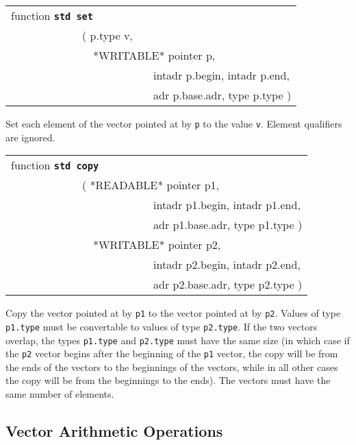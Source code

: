 \documentclass[12pt]{article}
\makeatletter
\newcommand{\TT}[1]{{\tt \bfseries #1}}
\newcommand{\ttstdmkey}[2]{\TT{std #1}\index{#1@{\tt std #1}!#2}}
\newenvironment{indpar}[1][0.3in]%
	{\begin{list}{}%
		     {\setlength{\itemsep}{0in}%
		      \setlength{\topsep}{0in}%
		      \setlength{\parsep}{1ex}%
		      \setlength{\labelwidth}{#1}%
		      \setlength{\leftmargin}{#1}%
		      \addtolength{\leftmargin}{\labelsep}}%
	 \item}%
	{\end{list}}
\makeatother
\begin{document}
\begin{indpar}

{\tt\begin{tabular}{@{}l}
function \ttstdmkey{set}{vectors} \\
~~~~~~~~~~~~~( p.type v, \\
~~~~~~~~~~~~~~~*WRITABLE* pointer p, \\
~~~~~~~~~~~~~~~~~~~~~~~~~~intadr p.begin, intadr p.end, \\
~~~~~~~~~~~~~~~~~~~~~~~~~~adr p.base.adr, type p.type ) \\
\end{tabular}}

\begin{indpar}
Set each element of the vector pointed at by {\tt p} to the value {\tt v}.
Element qualifiers are ignored.
\end{indpar}

{\tt\begin{tabular}{@{}l}
function \ttstdmkey{copy}{vectors} \\
~~~~~~~~~~~~~( *READABLE* pointer p1, \\
~~~~~~~~~~~~~~~~~~~~~~~~~~intadr p1.begin, intadr p1.end, \\
~~~~~~~~~~~~~~~~~~~~~~~~~~adr p1.base.adr, type p1.type ) \\
~~~~~~~~~~~~~~~*WRITABLE* pointer p2, \\
~~~~~~~~~~~~~~~~~~~~~~~~~~intadr p2.begin, intadr p2.end, \\
~~~~~~~~~~~~~~~~~~~~~~~~~~adr p2.base.adr, type p2.type ) \\
\end{tabular}}

\begin{indpar}
Copy the vector pointed at by {\tt p1} to the vector pointed at by
{\tt p2}.  Values of type {\tt p1.type} must be convertable to
values of type {\tt p2.type}.  If the two vectors overlap,
the types {\tt p1.type} and {\tt p2.type} must have the same
size (in which case if the {\tt p2} vector begins after
the beginning of the {\tt p1} vector, the copy will be from the ends of
the vectors to the beginnings of the vectors, while in all other
cases the copy will be from the beginnings to the ends).
The vectors must have the same number of elements.
\end{indpar}

\end{indpar}

\subsection{Vector Arithmetic Operations}
\label{VECTOR-ARITHMETIC-OPERATIONS}
\end{document}
